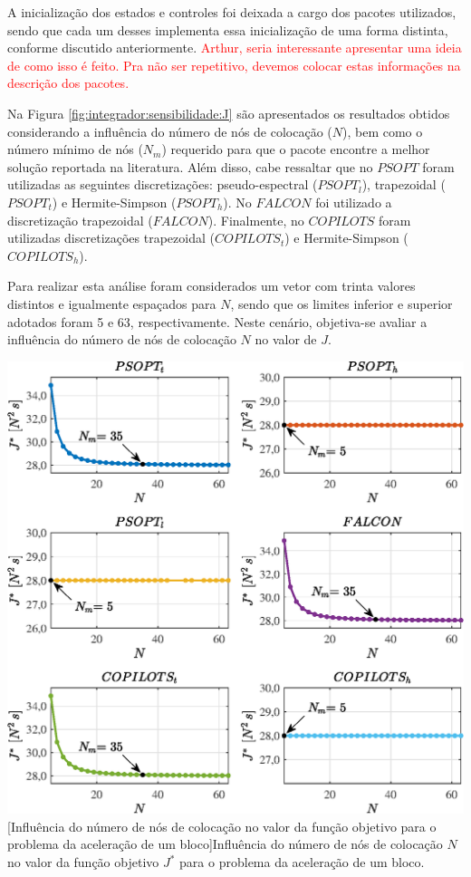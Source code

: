 A inicialização dos estados e controles foi deixada a cargo dos pacotes utilizados, sendo que cada um desses implementa essa inicialização de uma forma distinta, conforme discutido anteriormente. \textcolor{red}{Arthur, seria interessante apresentar uma ideia de como isso é feito. Pra não ser repetitivo, devemos colocar estas informações na descrição dos pacotes.} 

Na Figura \ref{fig:integrador:sensibilidade:J} são apresentados os resultados obtidos considerando a influência do número de nós de colocação ($N$), bem como o número mínimo de nós ($ N_m $) requerido para que o pacote encontre a melhor solução reportada na literatura. Além disso, cabe ressaltar que no $ PSOPT $ foram utilizadas as seguintes discretizações: pseudo-espectral ($PSOPT_l$), trapezoidal ($PSOPT_t$) e Hermite-Simpson ($PSOPT_h$). No $ FALCON $ foi utilizado a discretização trapezoidal ($FALCON$). Finalmente, no $COPILOTS$ foram utilizadas discretizações trapezoidal ($COPILOTS_t$) e Hermite-Simpson ($COPILOTS_h$). 

Para realizar esta análise foram considerados um vetor com trinta valores distintos e igualmente espaçados para $N$, sendo que os limites inferior e superior adotados foram 5 e 63, respectivamente. Neste cenário, objetiva-se avaliar a influência do número de nós de colocação $ N $ no valor de $ J $. 

\noindent	
\begin{minipage}{\textwidth}
	\vspace{\onelineskip}
	\centering
	\includegraphics[scale=0.7]{fig/resultados/integrador/sens/J}
[Influência do número de nós de colocação no valor da função objetivo para o problema da aceleração de um bloco]{Influência do número de nós de colocação $N$ no valor da função objetivo $J^*$ para o problema da aceleração de um bloco.}
	\label{fig:integrador:sensibilidade:J}
	\vspace{\onelineskip}
\end{minipage}

